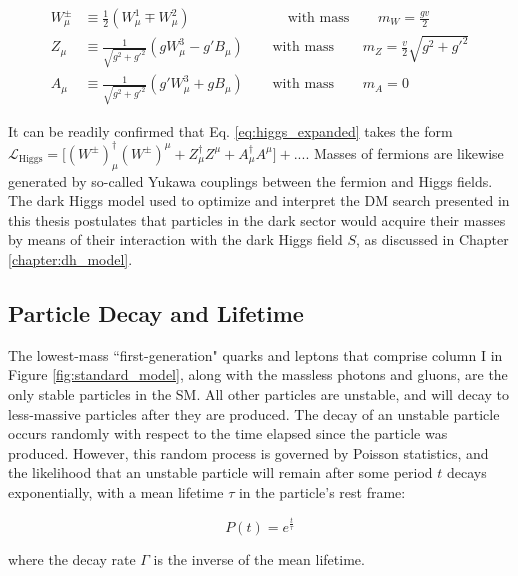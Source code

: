 \begin{equation}
\begin{split}
W^\pm_\mu & \equiv \frac{1}{2}(W_\mu^1 \mp W_\mu^2) \phantom{xxxxxxxxxlxx}\text{ with mass }\phantom{xxx} m_W=\frac{gv}{2} \\
Z_\mu & \equiv \frac{1}{\sqrt{g^2+g'^2}}(gW_\mu^3-g'B_\mu) \phantom{xxx}\text{ with mass }\phantom{xxx} m_Z = \frac{v}{2}\sqrt{g^2+g'^2} \\
A_\mu & \equiv \frac{1}{\sqrt{g^2+g'^2}}(g'W^3_\mu+gB_\mu) \phantom{xxx}\text{ with mass }\phantom{xxx} m_A = 0
\end{split}
\end{equation}

It can be readily confirmed that Eq. \ref{eq:higgs_expanded} takes the form \(\mathcal{L}_\text{Higgs} = \big[(W^\pm)_\mu^\dagger(W^\pm)^\mu + Z_\mu^\dagger Z^\mu + A_\mu^\dagger A^\mu\big] + ...\). Masses of fermions are likewise generated by so-called Yukawa couplings \cite{weinberg_1967} between the fermion and Higgs fields. The dark Higgs model used to optimize and interpret the DM search presented in this thesis postulates that particles in the dark sector would acquire their masses by means of their interaction with the dark Higgs field \(S\), as discussed in Chapter \ref{chapter:dh_model}. 

\subsection{Particle Decay and Lifetime}

The lowest-mass ``first-generation" quarks and leptons that comprise column I in Figure \ref{fig:standard_model}, along with the massless photons and gluons, are the only stable particles in the SM. All other particles are unstable, and will decay to less-massive particles after they are produced. The decay of an unstable particle occurs randomly with respect to the time elapsed since the particle was produced. However, this random process is governed by Poisson statistics, and the likelihood that an unstable particle will remain after some period \(t\) decays exponentially, with a mean lifetime \(\tau\) in the particle's rest frame:

\begin{equation}
\label{eq:particle_decay}
P(t) = e^{\frac{t}{\tau}}
\end{equation}

\noindent where the decay rate \(\Gamma\) is the inverse of the mean lifetime.  


